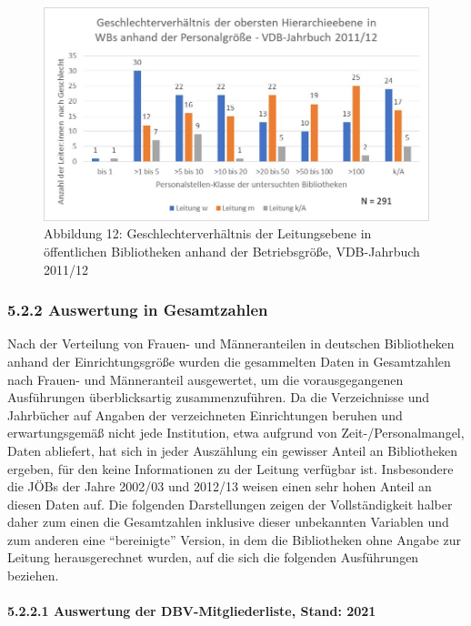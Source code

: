 \documentclass[a4paper,
fontsize=11pt,
oneside,
numbers=noperiodatend,
parskip=half-,
bibliography=totoc,
final
]{scrartcl}
\begin{document}
\begin{figure}
\centering
\includegraphics{img/Abb_12_VDB-2011.jpg}
\caption{Abbildung 12: Geschlechterverhältnis der Leitungsebene in
öffentlichen Bibliotheken anhand der Betriebsgröße, VDB-Jahrbuch
2011/12}
\end{figure}

\hypertarget{auswertung-in-gesamtzahlen}{%
\subsubsection{5.2.2 Auswertung in
Gesamtzahlen}\label{auswertung-in-gesamtzahlen}}

Nach der Verteilung von Frauen- und Männeranteilen in deutschen
Bibliotheken anhand der Einrichtungsgröße wurden die gesammelten Daten
in Gesamtzahlen nach Frauen- und Männeranteil ausgewertet, um die
vorausgegangenen Ausführungen überblicksartig zusammenzuführen. Da die
Verzeichnisse und Jahrbücher auf Angaben der verzeichneten Einrichtungen
beruhen und erwartungsgemäß nicht jede Institution, etwa aufgrund von
Zeit-/Personalmangel, Daten abliefert, hat sich in jeder Auszählung ein
gewisser Anteil an Bibliotheken ergeben, für den keine Informationen zu
der Leitung verfügbar ist. Insbesondere die JÖBs der Jahre 2002/03 und
2012/13 weisen einen sehr hohen Anteil an diesen Daten auf. Die
folgenden Darstellungen zeigen der Vollständigkeit halber daher zum
einen die Gesamtzahlen inklusive dieser unbekannten Variablen und zum
anderen eine \enquote{bereinigte} Version, in dem die Bibliotheken ohne
Angabe zur Leitung herausgerechnet wurden, auf die sich die folgenden
Ausführungen beziehen.

\paragraph{5.2.2.1 Auswertung der DBV-Mitgliederliste, Stand: 2021}
\end{document}
